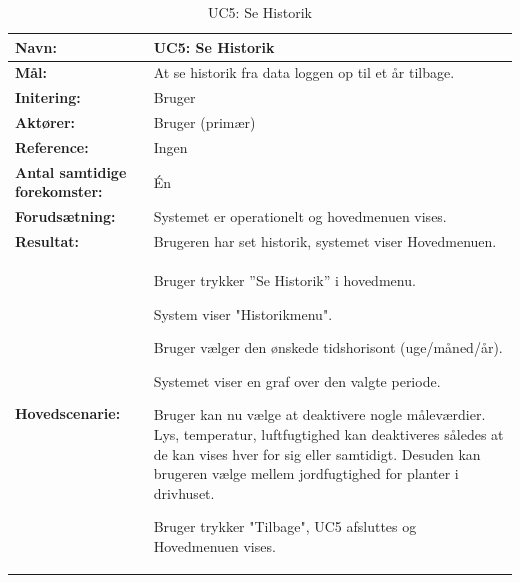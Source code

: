 \begin{table}[h]
\begin{tabularx}{\textwidth}{| >{\raggedright\arraybackslash}p{3.3 cm} | >{\raggedright\arraybackslash}X |} \hline

\textbf{Navn:} 						& UC5: Se Historik\\ \hline
\textbf{Mål:}						& At se historik fra data loggen op til et år tilbage. \\ \hline
\textbf{Initering:}					& Bruger \\ \hline
\textbf{Aktører:} 					& Bruger (primær) \\ \hline
\textbf{Reference:} 					& Ingen \\ \hline
\textbf{Antal samtidige forekomster:} & Én \\ \hline
\textbf{Forudsætning:} 				& Systemet er operationelt og hovedmenuen vises. \\ \hline
\textbf{Resultat:}					& Brugeren har set historik, systemet viser Hovedmenuen. \\ \hline
\textbf{Hovedscenarie:}				& 

\begin{packed_enum}
\item Bruger trykker ”Se Historik” i hovedmenu.
\item System viser "Historikmenu". 
\item Bruger vælger den ønskede tidshorisont (uge/måned/år).
\item Systemet viser en graf over den valgte periode.
\item Bruger kan nu vælge at deaktivere nogle måleværdier. Lys, temperatur, luftfugtighed kan deaktiveres således at de kan vises hver for sig eller samtidigt. Desuden kan brugeren vælge mellem jordfugtighed for planter i drivhuset.
\item Bruger trykker "Tilbage", UC5 afsluttes og Hovedmenuen vises.
\end{packed_enum} \\ \hline
\end{tabularx}
\caption{UC5: Se Historik}
\label{tbl:UC5}
\end{table}

\clearpage

